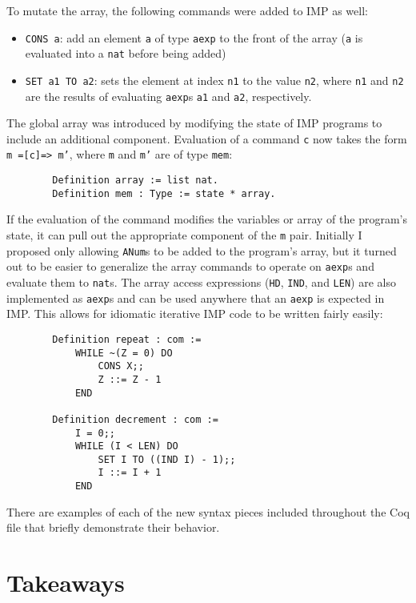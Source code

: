 \documentclass{article}
\begin{document}
    To mutate the array, the following commands were added to IMP as well:
    \begin{itemize}
        \item \texttt{CONS a}: add an element \texttt{a} of type \texttt{aexp} to the front of the array (\texttt{a} is evaluated into a \texttt{nat} before being added)
        \item \texttt{SET a1 TO a2}: sets the element at index \texttt{n1} to the value \texttt{n2}, where \texttt{n1} and \texttt{n2} are the results of evaluating \texttt{aexp}s \texttt{a1} and \texttt{a2}, respectively.
    \end{itemize}
    
    The global array was introduced by modifying the state of IMP programs to include an additional component. Evaluation of a command \texttt{c} now takes the form \texttt{m =[c]=> m'}, where \texttt{m} and \texttt{m'} are of type \texttt{mem}:
    \begin{lstlisting}
        Definition array := list nat.
        Definition mem : Type := state * array.
    \end{lstlisting}
    
    If the evaluation of the command modifies the variables or array of the program's state, it can pull out the appropriate component of the \texttt{m} pair. Initially I proposed only allowing \texttt{ANum}s to be added to the program's array, but it turned out to be easier to generalize the array commands to operate on \texttt{aexp}s and evaluate them to \texttt{nat}s. The array access expressions (\texttt{HD}, \texttt{IND}, and \texttt{LEN}) are also implemented as \texttt{aexp}s and can be used anywhere that an \texttt{aexp} is expected in IMP. This allows for idiomatic iterative IMP code to be written fairly easily:
    \begin{lstlisting}
        Definition repeat : com :=
            WHILE ~(Z = 0) DO
                CONS X;;
                Z ::= Z - 1
            END

        Definition decrement : com :=
            I = 0;;
            WHILE (I < LEN) DO
                SET I TO ((IND I) - 1);;
                I ::= I + 1
            END
    \end{lstlisting}

    There are examples of each of the new syntax pieces included throughout the Coq file that briefly demonstrate their behavior.
    \section{Takeaways}
\end{document}
